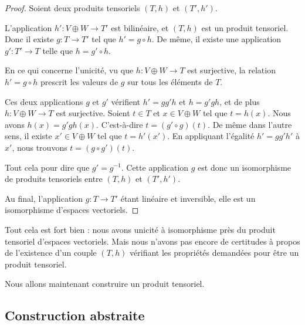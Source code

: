 \begin{proof}
	Soient deux produits tensoriels \( (T,h)\) et \( (T',h')\).

	\begin{subproof}
		\spitem[Existence]

		L'application \( h'\colon V\oplus W\to T'\) est bilinéaire, et \( (T,h)\) est un produit tensoriel. Donc il existe \( g\colon T\to T'\) tel que \( h'=g\circ h\). De même, il existe une application \( g'\colon T'\to T\) telle que \( h=g'\circ h\).

		\spitem[Unicité]

		En ce qui concerne l'unicité, vu que \( h\colon V\oplus W\to T\) est surjective, la relation \( h'=g\circ h\) prescrit les valeurs de \( g\) sur tous les éléments de \( T\).

		\spitem[Inversible]

		Ces deux applications \( g\) et \( g'\) vérifient \( h'=gg'h\) et \( h=g'gh\), et de plus \( h\colon V\oplus W\to T\) est surjective. Soient \( t\in T\) et \( x\in V\oplus W\) tel que \( t=h(x)\). Nous avons \( h(x)=g'gh(x)\). C'est-à-dire \( t=(g'\circ g)(t)\). De même dans l'autre sens, il existe \( x'\in V\oplus W\) tel que \( t=h'(x')\). En appliquant l'égalité \( h'=gg'h'\) à \( x'\), nous trouvons \( t=(g\circ g')(t)\).

		Tout cela pour dire que \( g'=g^{-1}\). Cette application \( g\) est donc un isomorphisme de produits tensoriels entre \( (T,h)\) et \( (T',h')\).
	\end{subproof}
	Au final, l'application \( g\colon T\to T'\) étant linéaire et inversible, elle est un isomorphisme d'espaces vectoriels.
\end{proof}

Tout cela est fort bien : nous avons unicité à isomorphisme près du produit tensoriel d'espaces vectoriels. Mais nous n'avons pas encore de certitudes à propos de l'existence d'un couple \( (T,h)\) vérifiant les propriétés demandées pour être un produit tensoriel.

Nous allons maintenant construire un produit tensoriel.

\subsection{Construction abstraite}

